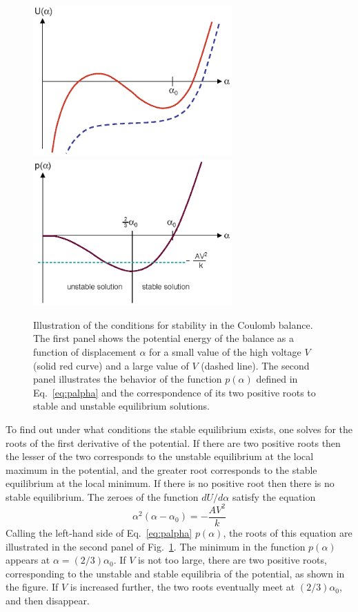 \documentclass{revtex4}
\begin{document}
\begin{figure}
\includegraphics[width=3in]{ualpha.eps}
\includegraphics[width=3in]{palpha.eps}
\caption{\label{fig:upalpha}
Illustration of the conditions for stability in the Coulomb balance.
The first panel shows the potential energy of the balance as a function
of displacement $\alpha$ for a small value of the high voltage $V$ (solid
red curve) and a large value of $V$ (dashed line).  The second panel
illustrates the behavior of the function $p(\alpha)$ defined in
Eq.~\ref{eq:palpha} and the correspondence of its two positive roots to
stable and unstable equilibrium solutions.
}
\end{figure}

To find out under what conditions the stable equilibrium exists, one
solves for the roots of the first derivative of the potential.  If there
are two positive roots then the lesser of the two corresponds to the 
unstable equilibrium at the local maximum in the potential, and the
greater root corresponds to the stable equilibrium at the local minimum.
If there is no positive root then there is no stable equilibrium.  The
zeroes of the function $dU/d\alpha$ satisfy the equation
\begin{equation}
\alpha^2(\alpha-\alpha_0) = -\frac{AV^2}{k}
\label{eq:palpha}
\end{equation}
Calling the left-hand side of Eq.~\ref{eq:palpha} $p(\alpha)$, the roots
of this equation are illustrated in the second panel of Fig.~\ref{fig:upalpha}.
The minimum in the function $p(\alpha)$ appears at $\alpha=(2/3)\alpha_0$.
If $V$ is not too large, there are two positive roots, corresponding to the
unstable and stable equilibria of the potential, as shown in the figure.
If $V$ is increased further, the two roots eventually meet at 
$(2/3)\alpha_0$, and then disappear.
\end{document}
